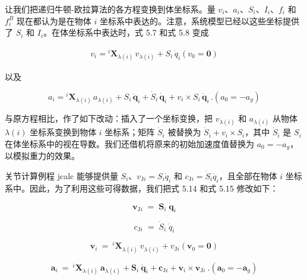 \documentclass[10pt,a4paper]{book}
\theoremstyle{thmstyle} %
\theoremstyle{defstyle} %
\theoremstyle{prostyle} %
\begin{document}
让我们把递归牛顿-欧拉算法的各方程变换到体坐标系。量 $v_i$、$a_i$、$S_i$、$I_i$、$f_i$ 和 $f_i^B$ 现在都认为是在物体 $i$ 坐标系中表达的。注意，系统模型已经以这些坐标提供了 $S_i$ 和 $I_i$。在体坐标系中表达时，式 5.7 和式 5.8 变成



$$
\begin{array}{r} { v _ { i } = { } ^{i} \mathbf { X } _ { \lambda ( i ) } \, v _ { \lambda ( i ) } + S _ { i } \, \dot { q } _ { i }  \left( v _ { 0 } = \mathbf { 0 } \right) } \end{array}
$$



以及



$$
a _ { i } = { } ^{i} \mathbf { X } _ { \lambda ( i ) } \, a _ { \lambda ( i ) } + S _ { i } \, \ddot { \mathbf { q } } _ { i } + \dot { S } _ { i } \, \dot { \mathbf { q } } _ { i } + v _ { i } \times S _ { i } \, \dot { \mathbf { q } } _ { i } \, .  ( a _ { 0 } = - a _ { g } )
$$



与原方程相比，作了如下改动：插入了一个坐标变换，把 $v_{\lambda(i)}$ 和 $a_{\lambda(i)}$ 从物体 $\lambda(i)$ 坐标系变换到物体 $i$ 坐标系；矩阵 $\dot{S}_i$ 被替换为 $\dot{S}_i + v_i \times S_i$，其中 $\dot{S}_i$ 是 $S_i$ 在体坐标系中的视在导数。我们还借机将原来的初始加速度值替换为 $a_0 = -a_g$，以模拟重力的效果。



关节计算例程 jcalc 能够提供量 $S_{i}$、$v_{\mathrm{J}i} = S_{i} \dot{q}_{i}$ 和 $c_{\mathrm{J}i} = \dot{S}_{i} \dot{q}_{i}$，且全部在物体 $i$ 坐标系中。因此，为了利用这些可得数据，我们把式 5.14 和式 5.15 修改如下：



$$
\boldsymbol { v } _ { \mathrm { J } i } \; = \; \boldsymbol { S } _ { i } \; \dot { \boldsymbol { q } } _ { i }
$$



$$
c _ { \mathrm { J } i } \; = \; \dot { S } _ { i } \; \dot { q } _ { i }
$$



$$
\boldsymbol{ v } _ { i } \ = \ { } ^{i} \boldsymbol{ X } _ { \lambda ( i ) } \ v _ { \lambda ( i ) } + v _ { \mathrm { J } i }  \left( \boldsymbol{ v } _ { 0 } = \mathbf { 0 } \right)
$$



$$
\boldsymbol{a}_i\:=\:{}^i\boldsymbol{X}_{\lambda(i)}\:\boldsymbol{a}_{\lambda(i)}+\boldsymbol{S}_i\:\ddot{\boldsymbol{q}}_i+\boldsymbol{c}_{\text{J}i}+\boldsymbol{v}_i\times\boldsymbol{v}_{\text{J}i}\:.(\boldsymbol{a}_0=-\boldsymbol{a}_g)
$$
\end{document}
